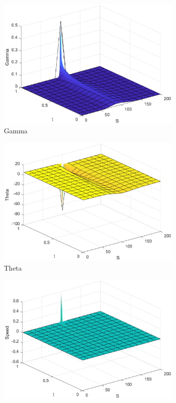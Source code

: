 \begin{figure}[H]
\begin{subfigure}[b]{0.35\linewidth}
        \includegraphics[width=\linewidth]{Imagenes/6_Sols/Put/Put_Gamma.eps}
        \caption{Gamma}
    \end{subfigure}
    \begin{subfigure}[b]{0.35\linewidth}
        \includegraphics[width=\linewidth]{Imagenes/6_Sols/Put/Put_Theta.eps}
        \caption{Theta}
    \end{subfigure}
    \begin{subfigure}[b]{0.35\linewidth}
        \includegraphics[width=\linewidth]{Imagenes/6_Sols/Put/Put_Speed.eps}

\end{subfigure}
\end{figure}
